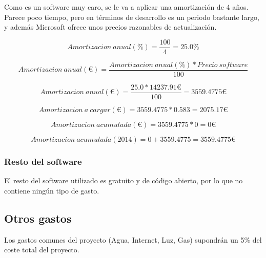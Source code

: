 Como es un software muy caro, se le va a aplicar una amortizaci\'on de 4 a\~nos.
Parece poco tiempo, pero en t\'erminos de desarrollo es un periodo bastante largo, y adem\'as
Microsoft ofrece unos precios razonables de actualizaci\'on.

\begin{center}
\begin{equation}
Amortizacion \ anual (\%) = \frac{100}{4} = 25.0 \%
\end{equation}

\begin{equation}
Amortizacion \ anual (€) = \frac{Amortizacion \ anual(\%) * Precio \ software}{100}
\end{equation}

\begin{equation}
Amortizacion \ anual (€) = \frac{25.0 * 14237.91 €}{100} = 3559.4775 €
\end{equation}

\begin{equation}
Amortizacion \ a \ cargar (€) = 3559.4775 * 0.583 = 2075.17 €
\end{equation}

\begin{equation}
Amortizacion \ acumulada (€) = 3559.4775 * 0 = 0 €
\end{equation}

\begin{equation}
Amortizacion \ acumulada (2014) = 0 + 3559.4775 = 3559.4775 €
\end{equation} 
\end{center} 

\subsubsection{Resto del software}
El resto del software utilizado es gratuito y de c\'odigo abierto, por lo que no contiene
ning\'un tipo de gasto.

\subsection{Otros gastos}
Los gastos comunes del proyecto (Agua, Internet, Luz, Gas) supondr\'an un 5\% del coste
total del proyecto.

